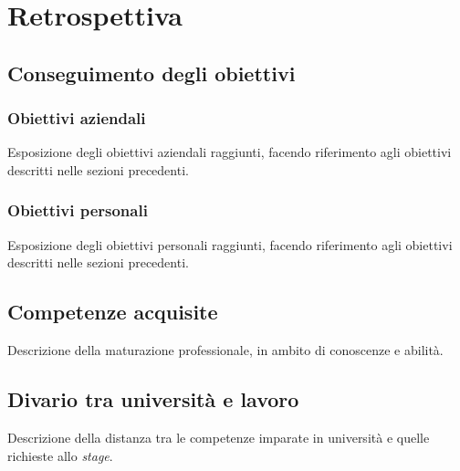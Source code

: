 \chapter{Retrospettiva}
\label{chap:retrospettiva}

\section{Conseguimento degli obiettivi}

\subsection{Obiettivi aziendali}\noindent
Esposizione degli obiettivi aziendali raggiunti, facendo riferimento agli obiettivi descritti nelle sezioni precedenti.

\subsection{Obiettivi personali}\noindent
Esposizione degli obiettivi personali raggiunti, facendo riferimento agli obiettivi descritti nelle sezioni precedenti.

\section{Competenze acquisite}\noindent
Descrizione della maturazione professionale, in ambito di conoscenze e abilità.

\section{Divario tra università e lavoro}\noindent
Descrizione della distanza tra le competenze imparate in università e quelle richieste allo \textit{stage}.